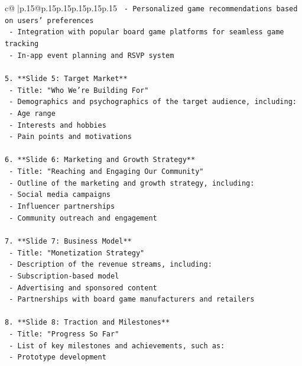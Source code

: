 \documentclass{article}
\begin{document}
{\begin{supertabular}{c@{$\;$}|p{.15\linewidth}@{}p{.15\linewidth}p{.15\linewidth}p{.15\linewidth}p{.15\linewidth}p{.15\linewidth}}
{{{\texttt{     {-} Personalized game recommendations based on users' preferences} \\
\texttt{     {-} Integration with popular board game platforms for seamless game tracking} \\
\texttt{     {-} In{-}app event planning and RSVP system} \\
\\ 
\texttt{5. **Slide 5: Target Market**} \\
\texttt{   {-} Title: "Who We're Building For"} \\
\texttt{   {-} Demographics and psychographics of the target audience, including:} \\
\texttt{     {-} Age range} \\
\texttt{     {-} Interests and hobbies} \\
\texttt{     {-} Pain points and motivations} \\
\\ 
\texttt{6. **Slide 6: Marketing and Growth Strategy**} \\
\texttt{   {-} Title: "Reaching and Engaging Our Community"} \\
\texttt{   {-} Outline of the marketing and growth strategy, including:} \\
\texttt{     {-} Social media campaigns} \\
\texttt{     {-} Influencer partnerships} \\
\texttt{     {-} Community outreach and engagement} \\
\\ 
\texttt{7. **Slide 7: Business Model**} \\
\texttt{   {-} Title: "Monetization Strategy"} \\
\texttt{   {-} Description of the revenue streams, including:} \\
\texttt{     {-} Subscription{-}based model} \\
\texttt{     {-} Advertising and sponsored content} \\
\texttt{     {-} Partnerships with board game manufacturers and retailers} \\
\\ 
\texttt{8. **Slide 8: Traction and Milestones**} \\
\texttt{   {-} Title: "Progress So Far"} \\
\texttt{   {-} List of key milestones and achievements, such as:} \\
\texttt{     {-} Prototype development} \\
}}}
\end{supertabular}}
\end{document}
